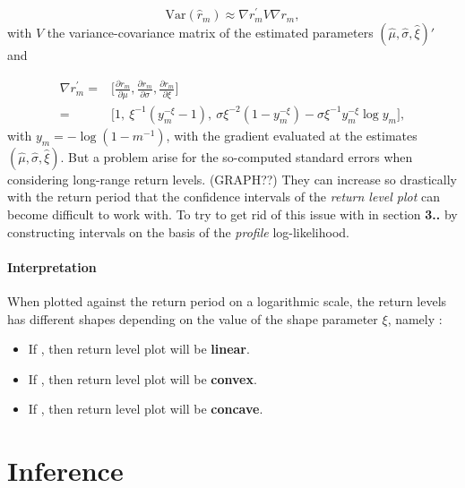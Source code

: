 \documentclass[11pt,a4paper,openany ]{book}
\begin{document}
\begin{equation*}
\text{Var}(\hat{r}_m)\approx\nabla{r^{'}_m}V\nabla{r_m},
\end{equation*}
with $V$ the variance-covariance matrix of the estimated parameters $(\hat{\mu},\hat{\sigma},\hat{\xi})'$ and 

\begin{equation} \label{delta}
\begin{aligned}
\nabla r^{'}_m=
& \Bigg[\frac{\partial r_m}{\partial\mu},\frac{\partial r_m}{\partial\sigma},\frac{\partial r_m}{\partial\xi}\Bigg] \\ 
= & \Big[1,\ \xi^{-1}(y_m^{-\xi}-1),\ \sigma\xi^{-2}(1-y_m^{-\xi})-\sigma\xi^{-1}y_m^{-\xi}\log y_m\Big],
\end{aligned}
\end{equation}
with $y_m=-\log (1-m^{-1})$, with the gradient evaluated at the estimates $(\hat{\mu},\hat{\sigma},\hat{\xi})$.
But a problem arise for the so-computed standard errors when considering long-range return levels. (GRAPH??) They can increase so drastically with the return period that the confidence intervals of the \emph{return level plot} can become difficult to work with. To try to get rid of this issue with in section \textbf{3..} by constructing intervals on the basis of the \emph{profile} log-likelihood. 

\paragraph*{Interpretation}

When plotted against the return period on a logarithmic scale, the return levels has different shapes depending on the value of the shape parameter $\xi$, namely :

\begin{itemize}
	\item If , then return level plot will be \textbf{linear}.
     \item If , then return level plot will be \textbf{convex}.
     \item If , then return level plot will be \textbf{concave}.
\end{itemize}



\section{Inference}\label{sec::gevinfernce} 
\end{document}
